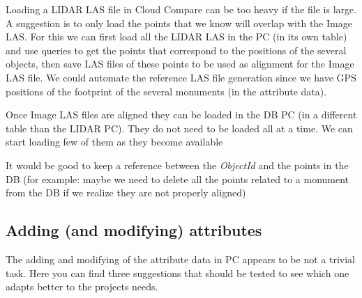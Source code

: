 \documentclass[a4paper,11pt]{article}
\begin{document}
Loading a LIDAR LAS file in Cloud Compare can be too heavy if the file is large. A suggestion is to only load the points that we know will overlap with the Image LAS. For this we can first load all the LIDAR LAS in the PC (in its own table) and use queries to get the points that correspond to the positions of the several objects, then save LAS files of these points to be used as alignment for the Image LAS file. We could automate the reference LAS file generation since we have GPS positions of the footprint of the several monuments (in the attribute data).

Once Image LAS files are aligned they can be loaded in the DB PC (in a different table than the LIDAR PC). They do not need to be loaded all at a time. We can start loading few of them as they become available

It would be good to keep a reference between the \textit{ObjectId} and the points in the DB (for example: maybe we need to delete all the points related to a monument from the DB if we realize they are not properly aligned)

\subsection{Adding (and modifying) attributes}
\label{sec:attr}

The adding and modifying of the attribute data in PC appears to be not a trivial task. Here you can find three suggestions that should be tested to see which one adapts better to the projects needs.
\end{document}
